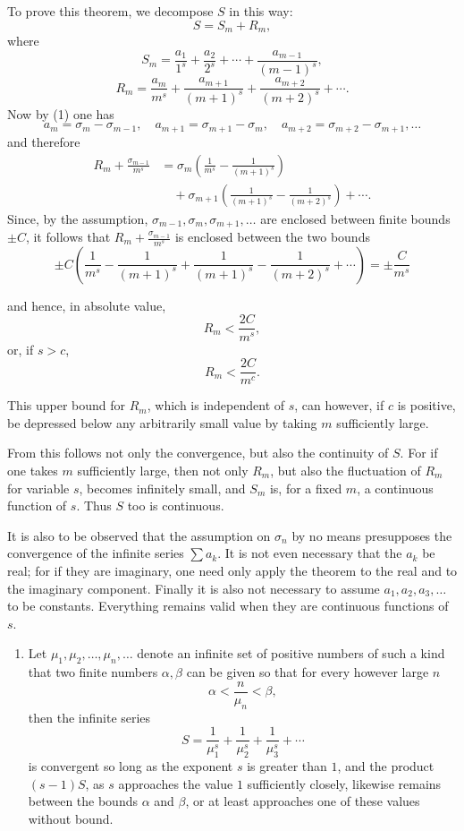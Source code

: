 \documentclass[11pt]{article}
\begin{document}
To prove this theorem, we decompose $S$ in this way:
\[
S=S_m+R_m,
\]
where
\[
S_m=\frac{a_1}{1^s}+\frac{a_2}{2^s}+\cdots+\frac{a_{m-1}}{(m-1)^s},
\]
\[
R_m=\frac{a_m}{m^s}+\frac{a_{m+1}}{(m+1)^s}+\frac{a_{m+2}}{(m+2)^s}+\cdots .
\]
Now by (1) one has
\[
a_m=\sigma_m-\sigma_{m-1},\quad a_{m+1}=\sigma_{m+1}-\sigma_m,\quad
a_{m+2}=\sigma_{m+2}-\sigma_{m+1},\ldots
\]
and therefore
\[
\begin{aligned}
R_m+\frac{\sigma_{m-1}}{m^s}
&=\sigma_m\left(\frac1{m^s}-\frac1{(m+1)^s}\right)\\
&\quad+\sigma_{m+1}\left(\frac1{(m+1)^s}-\frac1{(m+2)^s}\right)+\cdots .
\end{aligned}
\]
Since, by the assumption, $\sigma_{m-1},\sigma_m,\sigma_{m+1},\ldots$ are enclosed between finite bounds $\pm C$, it follows that $R_m+\frac{\sigma_{m-1}}{m^s}$ is enclosed between the two bounds
\[
\pm C\left(\frac1{m^s}-\frac1{(m+1)^s}+\frac1{(m+1)^s}-\frac1{(m+2)^s}+\cdots\right)
=\pm\frac{C}{m^s}
\]

and hence, in absolute value,
\[
R_m<\frac{2C}{m^s},
\]
or, if $s>c$,
\[
R_m<\frac{2C}{m^c}.
\]

This upper bound for $R_m$, which is independent of $s$, can however, if $c$ is positive, be depressed below any arbitrarily small value by taking $m$ sufficiently large.

From this follows not only the convergence, but also the continuity of $S$. For if one takes $m$ sufficiently large, then not only $R_m$, but also the fluctuation of $R_m$ for variable $s$, becomes infinitely small, and $S_m$ is, for a fixed $m$, a continuous function of $s$. Thus $S$ too is continuous.

It is also to be observed that the assumption on $\sigma_n$ by no means presupposes the convergence of the infinite series $\sum a_k$. It is not even necessary that the $a_k$ be real; for if they are imaginary, one need only apply the theorem to the real and to the imaginary component. Finally it is also not necessary to assume $a_1,a_2,a_3,\ldots$ to be constants. Everything remains valid when they are continuous functions of $s$.

\begin{enumerate}[label=\textbf{\arabic*.},leftmargin=2.2em,start=2]
\item Let $\mu_1,\mu_2,\ldots,\mu_n,\ldots$ denote an infinite set of positive numbers of such a kind that two finite numbers $\alpha,\beta$ can be given so that for every however large $n$
\begin{equation}
\alpha<\frac{n}{\mu_n}<\beta,
\tag{3}
\end{equation}
then the infinite series
\[
S=\frac1{\mu_1^s}+\frac1{\mu_2^s}+\frac1{\mu_3^s}+\cdots
\]
is convergent so long as the exponent $s$ is greater than $1$, and the product $(s-1)S$, as $s$ approaches the value $1$ sufficiently closely, likewise remains between the bounds $\alpha$ and $\beta$, or at least approaches one of these values without bound.
\end{enumerate}
\end{document}
